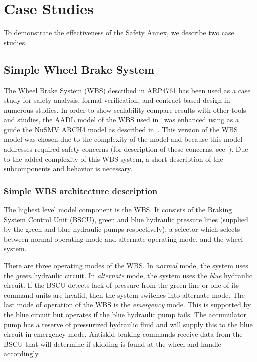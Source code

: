  \section{Case Studies}
\label{sec:case_study}
To demonstrate the effectiveness of the Safety Annex, we describe two case studies.



\iffalse
\subsection{Simple Wheel Brake System}
The Wheel Brake System (WBS) described in ARP4761 has been used as a case study for safety analysis, formal verification, and contract based design in numerous studies. In order to show scalability compare results with other tools and studies, the AADL model of the WBS used in~\cite{Stewart17:IMBSA} was enhanced using as a guide the NuSMV ARCH4 model as described in~\cite{DBLP:conf/cav/BozzanoCPJKPRT15}. This version of the WBS model was chosen due to the complexity of the model and because this model addresses required safety concerns (for description of these concerns, see~\cite{DBLP:conf/cav/BozzanoCPJKPRT15}). Due to the added complexity of this WBS system, a short description of the subcomponents and behavior is necessary.

\subsubsection{Simple WBS architecture description}
The highest level model component is the WBS. It consists of the Braking System Control Unit (BSCU), green and blue hydraulic pressure lines (supplied by the green and blue hydraulic pumps respectively), a selector which selects between normal operating mode and alternate operating mode, and the wheel system.

There are three operating modes of the WBS. In \textit{normal} mode, the system uses the \textit{green} hydraulic circuit. In \textit{alternate} mode, the system uses the \textit{blue} hydraulic circuit.  If the BSCU detects lack of pressure from the green line or one of its command units are invalid, then the system switches into alternate mode. The last mode of operation of the WBS is the \textit{emergency} mode. This is supported by the blue circuit but operates if the blue hydraulic pump fails. The accumulator pump has a reserve of pressurized hydraulic fluid and will supply this to the blue circuit in emergency mode.  Antiskid braking commands receive data from the BSCU that will determine if skidding is found at the wheel and handle accordingly.

